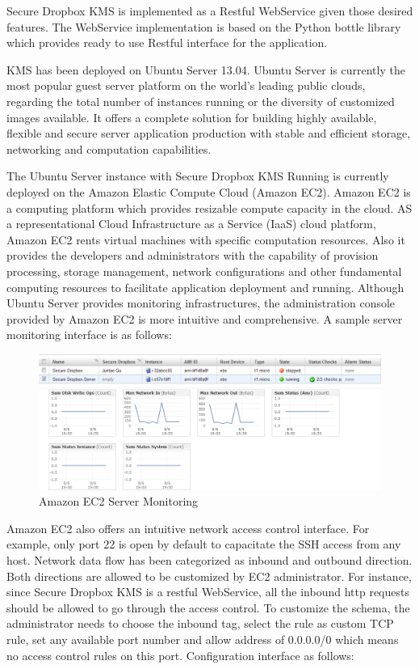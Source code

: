 Secure Dropbox KMS is implemented as a Restful WebService given those desired features. The WebService implementation is based on the Python bottle library which provides ready to use Restful interface for the application.

KMS has been deployed on Ubuntu Server 13.04. Ubuntu Server is currently the most popular guest server platform on the world’s leading public clouds, regarding the total number of instances running or the diversity of customized images available. It offers a complete solution for building highly available, flexible and secure server application production with stable and efficient storage, networking and computation capabilities.

The Ubuntu Server instance with Secure Dropbox KMS Running is currently deployed on the Amazon Elastic Compute Cloud (Amazon EC2). Amazon EC2 is a computing platform which provides resizable compute capacity in the cloud. AS a representational Cloud Infrastructure as a Service (IaaS) cloud platform, Amazon EC2 rents virtual machines with specific computation resources. Also it provides the developers and administrators with the capability of provision processing, storage management, network configurations and other fundamental computing resources to facilitate application deployment and running. Although Ubuntu Server provides monitoring infrastructures, the administration console provided by Amazon EC2 is more intuitive and comprehensive. A sample server monitoring interface is as follows:


\begin{figure}[h]
        \centering
        \includegraphics[width=1.0\textwidth]{figures/Amazon_EC2_Server_Monitoring.png}
        \caption[Amazon EC2 Server Monitoring] {Amazon EC2 Server Monitoring}
\end{figure}

Amazon EC2 also offers an intuitive network access control interface. For example, only port 22 is open by default to capacitate the SSH access from any host. Network data flow has been categorized as inbound and outbound direction. Both directions are allowed to be customized by EC2 administrator. For instance, since Secure Dropbox KMS is a restful WebService, all the inbound http requests should be allowed to go through the access control. To customize the schema, the administrator needs to choose the inbound tag, select the rule as custom TCP rule, set any available port number and allow address of 0.0.0.0/0 which means no access control rules on this port. Configuration interface as follows:


